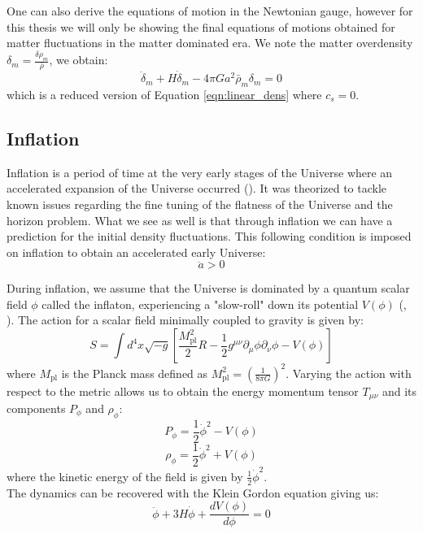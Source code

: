 One can also derive the equations of motion in the Newtonian gauge, however for this thesis we will only be showing the final equations of motions obtained for matter 
fluctuations in the matter dominated era. We note the matter overdensity $\delta_m = \frac{\delta \rho_m}{\bar{\rho}}$, we obtain:
\begin{equation}
    \ddot{\delta}_m + H \dot{\delta}_m - 4\pi G a^2 \bar{\rho}_m\delta_m = 0
\end{equation}
which is a reduced version of Equation \ref{eqn:linear_dens} where $c_s=0$.

\subsection{Inflation}

Inflation is a period of time at the very early stages of the Universe 
where an accelerated expansion of the Universe occurred (\cite{Guth_1981}). It was theorized to tackle known issues regarding the fine tuning of the flatness of the Universe and the horizon problem.
What we see as well is that through inflation we can have a prediction for the initial density fluctuations. 
This following condition is imposed on inflation to obtain an accelerated early Universe:
\begin{equation}
    \ddot{a} > 0
\end{equation}

During inflation, we assume that the Universe is dominated by a quantum scalar field $\phi$ called the inflaton, experiencing a "slow-roll" down its potential $V(\phi)$ (\cite{Mukhanov_1992}, \cite{Albrecht_1982}). 
The action for a scalar field minimally coupled to gravity is given by:
\begin{equation}
    S = \int d^4x \sqrt{-g} \left[ \frac{M^2_{\text{pl}}}{2} R - \frac{1}{2} g^{\mu \nu} \partial_{\mu}\phi \partial_{\nu}\phi - V(\phi) \right]
\end{equation}
where $M_{\text{pl}} $ is the Planck mass defined as $M^2_{\text{pl}} = \left(\frac{1}{8\pi G}\right)^2$. Varying the action with respect to the metric allows us to obtain 
the energy momentum tensor $T_{\mu \nu}$ and its components $P_{\phi}$ and $\rho_{\phi}$:
\begin{equation}
    P_{\phi} = \frac{1}{2} \dot{\phi}^2 - V(\phi)
\end{equation}
\begin{equation}
    \rho_{\phi} = \frac{1}{2} \dot{\phi}^2 + V(\phi)
\end{equation}
where the kinetic energy of the field is given by $\frac{1}{2} \dot{\phi}^2$.\\
The dynamics can be recovered with the Klein Gordon equation giving us:
\begin{equation}
    \ddot{\phi} + 3H \dot{\phi} + \frac{d V(\phi)}{d \phi} = 0
\end{equation}

